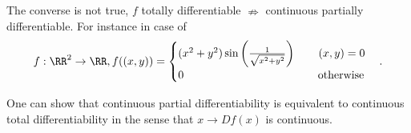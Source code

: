 \begin{rem}
  The converse is not true, $f$ totally differentiable $\nRightarrow$ continuous partially differentiable. For instance in case of \[f:\RR^2\to \RR, f((x,y))=\begin{cases}(x^2+y^2)\sin\left(\frac{1}{\sqrt{x^2+y^2}}\right)\qquad(x,y)=0\\0\qquad\qquad\qquad\qquad\qquad\qquad\text{otherwise}\end{cases}.\]
\end{rem}
\begin{rem}
  One can show that continuous partial differentiability is equivalent to continuous total differentiability in the sense that $x\to Df(x)$ is continuous. 
\end{rem}